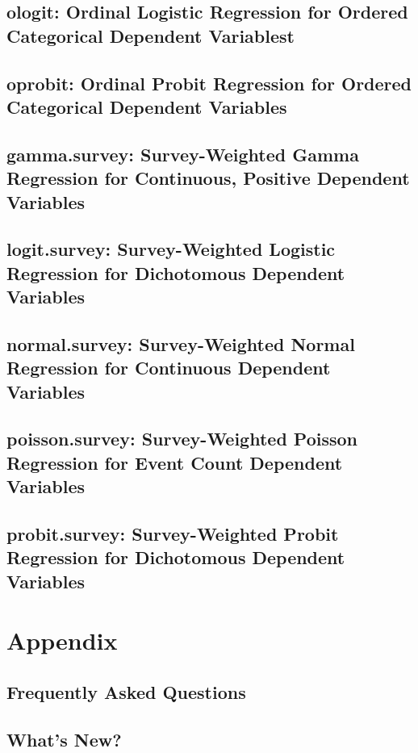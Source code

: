 \documentclass{book}
\begin{document}

\chapter[ologit]{ologit: Ordinal Logistic Regression for Ordered Categorical Dependent Variablest}
\label{chapter:Ologit}


\chapter[oprobit]{oprobit: Ordinal Probit Regression for Ordered Categorical Dependent Variables}
\label{chapter:Oprobit}


\chapter[gamma.survey]{gamma.survey: Survey-Weighted Gamma Regression for Continuous, Positive Dependent Variables}
\label{chapter:Gamma.survey}


\chapter[logit.survey]{logit.survey: Survey-Weighted Logistic Regression for Dichotomous Dependent Variables}
\label{chapter:Logit.survey}


\chapter[normal.survey]{normal.survey: Survey-Weighted Normal Regression for Continuous Dependent Variables}
\label{chapter:Normal.survey}


\chapter[poisson.survey]{poisson.survey: Survey-Weighted Poisson Regression for Event Count Dependent Variables}
\label{chapter:Poisson.survey}


\chapter[probit.survey]{probit.survey: Survey-Weighted Probit Regression for Dichotomous Dependent Variables}
\label{chapter:Probit.survey}


\part{Appendix}
\label{part:Appendix}

\chapter[FAQ]{Frequently Asked Questions}
\label{chapter:Faq}


\chapter[What's New?]{What's New?}
\label{chapter:Whatsnew}




\end{document}
